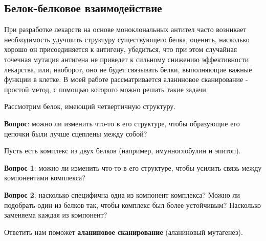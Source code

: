 \subsection{Белок-белковое взаимодействие}
При разработке лекарств на основе моноклональных антител часто возникает необходимость улучшить структуру существующего белка, оценить, насколько хорошо он присоединяется к антигену, убедиться, что при этом случайная точечная мутация антигена не приведет к сильному снижению эффективности лекарства, или, наоборот, оно не будет связывать белки, выполняющие важные функции в клетке.
В моей работе рассматривается аланиновое сканирование - простой метод, с помощью которого можно решать такие задачи. 


Рассмотрим белок, имеющий четвертичную структуру.

\textbf{Вопрос}: можно ли изменить что-то в его структуре, чтобы образующие его цепочки были лучше сцеплены между собой?

Пусть есть комплекс из двух белков (например, имунноглобулин и эпитоп).

\textbf{Вопрос 1}: можно ли изменить что-то в его структуре, чтобы усилить связь между компонентами комплекса?

\textbf{Вопрос 2}: насколько специфична одна из компонент комплекса?  Можно ли подобрать один из белков так, чтобы комплекс был более устойчивым? Насколько заменяема каждая из компонент?

Ответить нам поможет \textbf{аланиновое сканирование} (аланиновый мутагенез).

